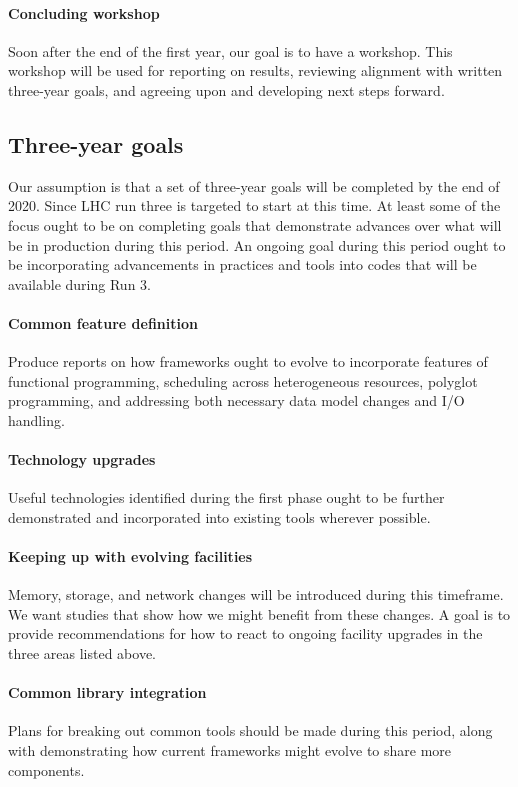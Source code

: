 \documentclass[12pt,a4paper]{article}
\begin{document}
\paragraph{Concluding workshop} Soon after the end of the first year,
our goal is to have a workshop. This workshop will be used for
reporting on results, reviewing alignment with written three-year
goals, and agreeing upon and developing next steps forward.

\subsection{Three-year goals}
\label{sec:three-year-goals}

Our assumption is that a set of three-year goals will be completed by
the end of 2020. Since LHC run three is targeted to start at this
time.  At least some of the focus ought to be on completing goals that
demonstrate advances over what will be in production during this
period.  An ongoing goal during this period ought to be incorporating
advancements in practices and tools into codes that will be available
during Run 3.

\paragraph{Common feature definition} Produce reports on how
frameworks ought to evolve to incorporate features of functional
programming, scheduling across heterogeneous resources, polyglot
programming, and addressing both necessary data model changes and I/O
handling.

\paragraph{Technology upgrades} Useful technologies identified during
the first phase ought to be further demonstrated and incorporated into
existing tools wherever possible.

\paragraph{Keeping up with evolving facilities} Memory, storage, and
network changes will be introduced during this timeframe. We want
studies that show how we might benefit from these changes. A goal is
to provide recommendations for how to react to ongoing facility
upgrades in the three areas listed above.

\paragraph{Common library integration} Plans for breaking out common
tools should be made during this period, along with demonstrating how
current frameworks might evolve to share more components.
\end{document}
